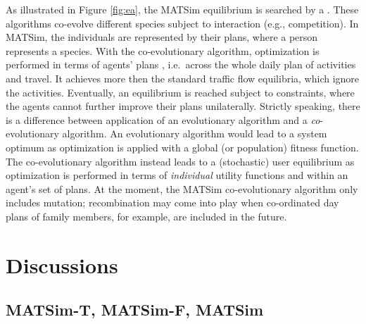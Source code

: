 As illustrated in Figure \ref{fig:ea}, the MATSim equilibrium is searched by a \emph{}. These algorithms co-evolve different species subject to interaction (e.g., competition). In MATSim, the individuals are represented by their plans, where a person represents a species. With the co-evolutionary algorithm, optimization is performed in terms of agents' plans , i.e.\ across the whole daily plan of activities and travel. It achieves more then the standard traffic flow equilibria, which ignore the activities. Eventually, an equilibrium is reached subject to constraints, where the agents cannot further improve their plans unilaterally. Strictly speaking, there is a difference between application of an evolutionary algorithm and a \emph{co}-evolutionary algorithm. An evolutionary algorithm would lead to a system optimum as optimization is applied with a global (or population) fitness function. The co-evolutionary algorithm instead leads to a (stochastic) user equilibrium as optimization is performed in terms of \emph{individual} utility functions and within an agent's set of plans. At the moment, the MATSim co-evolutionary algorithm only includes mutation; recombination may come into play when co-ordinated day plans of family members, for example, are included in the future.


\section{Discussions}
\subsection{MATSim-T, MATSim-F, MATSim}
\label{sec:matsimtd}



